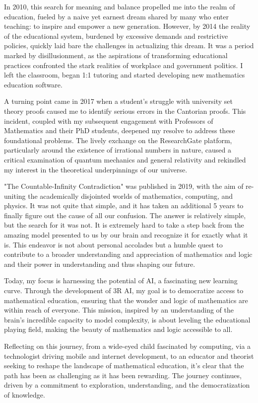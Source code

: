 \documentclass[12pt]{article}
\begin{document}
In 2010, this search for meaning and balance propelled me into the realm of education, fueled by a naive yet earnest dream shared by many who enter teaching: to inspire and empower a new generation. However, by 2014 the reality of the educational system, burdened by excessive demands and restrictive policies, quickly laid bare the challenges in actualizing this dream. It was a period marked by disillusionment, as the aspirations of transforming educational practices confronted the stark realities of workplace and government politics. I left the classroom, began 1:1 tutoring and started developing new mathematics education software.

A turning point came in 2017 when a student's struggle with university set theory proofs caused me to identify serious errors in the Cantorian proofs. This incident, coupled with my subsequent engagement with Professors of Mathematics and their PhD students, deepened my resolve to address these foundational problems. The lively exchange on the ResearchGate platform, particularly around the existence of irrational numbers in nature, caused a critical examination of quantum mechanics and general relativity and rekindled my interest in the theoretical underpinnings of our universe.

"The Countable-Infinity Contradiction" was published in 2019, with the aim of re-uniting the academically disjointed worlds of mathematics, computing, and physics. It was not quite that simple, and it has taken an additional 5 years to finally figure out the cause of all our confusion. The answer is relatively simple, but the search for it was not. It is extremely hard to take a step back from the amazing model presented to us by our brain and recognize it for exactly what it is. This endeavor is not about personal accolades but a humble quest to contribute to a broader understanding and appreciation of mathematics and logic and their power in understanding and thus shaping our future.

Today, my focus is harnessing the potential of AI, a fascinating new learning curve. Through the development of 3R AI, my goal is to democratize access to mathematical education, ensuring that the wonder and logic of mathematics are within reach of everyone. This mission, inspired by an understanding of the brain's incredible capacity to model complexity, is about leveling the educational playing field, making the beauty of mathematics and logic accessible to all.

Reflecting on this journey, from a wide-eyed child fascinated by computing, via a technologist driving mobile and internet development, to an educator and theorist seeking to reshape the landscape of mathematical education, it's clear that the path has been as challenging as it has been rewarding. The journey continues, driven by a commitment to exploration, understanding, and the democratization of knowledge.
\end{document}
